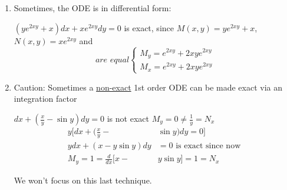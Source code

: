 \begin{enumerate}[label=\protect\circled{\Roman*}]
	\item Sometimes, the ODE is in differential form:
	\begin{example}
		$(ye^{2xy} + x)dx + xe^{2xy}dy = 0$ is exact, since $M(x,y) = ye^{2xy} + x$, $N(x,y) = xe^{2xy}$ and 
		\begin{equation*}
			\textit{are equal}
			\begin{cases}
				M_y = e^{2xy} + 2xye^{2xy} \\
				M_x = e^{2xy} + 2xye^{2xy}
			\end{cases}
		\end{equation*}
	\end{example}
	\item Caution: Sometimes a \underline{non-exact} 1st order ODE can be made exact via an integration factor
		\begin{example}
		$dx + (\frac{x}{y} - \sin y)dy = 0$ is not exact $M_y = 0 \neq \frac{1}{y} = N_x$\\
		\begin{align*}
			y[dx + (\frac{x}{y} - & \sin y)dy  = 0]\\
			ydx + (x - y\sin y)dy & = 0 \text{ is exact since now }\\ M_y = 1 = \frac{d}{dx} [x - & y\sin y] = 1 = N_x
		\end{align*}
		\begin{center}
			We won't focus on this last technique.
		\end{center}
		\end{example}
\end{enumerate}
